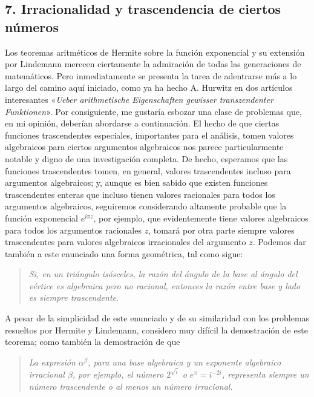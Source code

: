 \documentclass[a4paper, 12pt]{article}
\begin{document}
  
\subsection*{7. Irracionalidad y trascendencia de ciertos números }


Los teoremas aritméticos de Hermite sobre la función exponencial y su extensión por Lindemann merecen ciertamente la admiración de todas las generaciones de matemáticos. Pero inmediatamente se presenta la tarea de adentrarse más a lo largo del camino aquí iniciado, como ya ha hecho A. Hurwitz en dos artículos interesantes «\textit{Ueber arithmetische Eigenschaften gewisser transzendenter Funktionen}». Por consiguiente, me  gustaría esbozar una clase de problemas que, en mi opinión, deberían  abordarse a continuación. El hecho de que ciertas funciones trascendentes especiales, importantes para el análisis, tomen valores algebraicos para ciertos argumentos algebraicos nos parece particularmente notable y digno de una investigación completa. De hecho, esperamos que las funciones trascendentes tomen, en general, valores trascendentes incluso para argumentos algebraicos; y, aunque es bien sabido que existen funciones trascendentes enteras que incluso tienen valores racionales para  todos los argumentos algebraicos, seguiremos considerando altamente 
probable que la función exponencial $e^{i\pi z}$,
 por ejemplo, que evidentemente tiene valores algebraicos para todos los argumentos racionales $z$, tomará por otra parte siempre valores trascendentes para valores algebraicos irracionales del argumento $z$. Podemos dar también a este enunciado una forma geométrica, tal como sigue: 
 
 \begin{quote}\small
 
\textit{Si, en un triángulo isósceles, la razón del ángulo de la base al ángulo del vértice es algebraica pero no racional, entonces la razón entre base y lado es siempre trascendente}. 

\end{quote}

A pesar de la simplicidad de este enunciado y de su similaridad con los problemas resueltos por Hermite y Lindemann, considero muy difícil la demostración de este teorema; como también la demostración de que

\begin{quote} \small

\textit{La expresión $\alpha^\beta$,   para una base algebraica y un exponente algebraico irracional $\beta$, por ejemplo, el número $2^{\sqrt{i}}$  o $e^\pi=i^{-2i}$,  
    representa siempre un número trascendente o al menos un número irracional.} 

\end{quote}    
    
\end{document}
